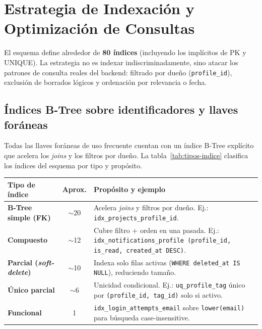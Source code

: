 \section{Estrategia de Indexación y Optimización de Consultas}
\label{sec:indexacion}

El esquema define alrededor de \textbf{80 índices} (incluyendo los implícitos de PK y
UNIQUE). La estrategia no es indexar indiscriminadamente, sino atacar los patrones de
consulta reales del backend: filtrado por dueño (\texttt{profile\_id}), exclusión de
borrados lógicos y ordenación por relevancia o fecha.

\subsection{Índices B-Tree sobre identificadores y llaves foráneas}
\label{subsec:btree}

Todas las llaves foráneas de uso frecuente cuentan con un índice B-Tree explícito que
acelera los \textit{joins} y los filtros por dueño. La tabla~\ref{tab:tipos-indice}
clasifica los índices del esquema por tipo y propósito.

\vspace{0.2cm}
\noindent
\renewcommand{\arraystretch}{1.3}
\fontsize{8.5}{10.2}\selectfont\sffamily
\begin{tabularx}{\textwidth}{|>{\bfseries\color{colorPrimario}}l|c|X|}
\hline
\rowcolor{headerTabla}
\textbf{Tipo de índice} & \textbf{Aprox.} & \textbf{Propósito y ejemplo} \\
\hline
B-Tree simple (FK) & $\sim$20 & Acelera \textit{joins} y filtros por dueño. Ej.: \texttt{idx\_projects\_profile\_id}. \\
\hline
\rowcolor{grisTecnico}
Compuesto & $\sim$12 & Cubre filtro + orden en una pasada. Ej.: \texttt{idx\_notifications\_profile (profile\_id, is\_read, created\_at DESC)}. \\
\hline
Parcial (\textit{soft-delete}) & $\sim$10 & Indexa solo filas activas (\texttt{WHERE deleted\_at IS NULL}), reduciendo tamaño. \\
\hline
\rowcolor{grisTecnico}
Único parcial & $\sim$6 & Unicidad condicional. Ej.: \texttt{uq\_profile\_tag} único por \texttt{(profile\_id, tag\_id)} solo si activo. \\
\hline
Funcional & 1 & \texttt{idx\_login\_attempts\_email} sobre \texttt{lower(email)} para búsqueda case-insensitive. \\
\hline
\end{tabularx}
\label{tab:tipos-indice}

